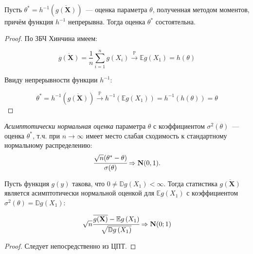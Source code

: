 \begin{thm*}
Пусть $\theta^{*}=h^{-1}(\overline{g(\mathbf{X})})$~--- оценка параметра $\theta$, полученная методом моментов, причём функция $h^{-1}$ непрерывна. Тогда оценка $\theta^{*}$ состоятельна.
\end{thm*}

\begin{proof}
По ЗБЧ Хинчина имеем:

\begin{equation*}
    \overline{g(\mathbf{X})}=\frac{1}{n} \sum\limits_{i=1}^{n} g\left(X_{i}\right) \xrightarrow[]{\mathbb{P}} \mathbb{E} g\left(X_{1}\right)=h(\theta)
\end{equation*}

Ввиду непрерывности функции $h^{-1}$:

\begin{equation*}
    \theta^{*}=h^{-1}(\overline{g(\mathbf{X})}) \xrightarrow[]{\mathbb{P}} h^{-1}\left(\mathbb{E} g\left(X_{1}\right)\right)=h^{-1}(h(\theta))=\theta
\end{equation*}
\end{proof}

\begin{defn}
{\it Асимптотически нормальная оценка} параметра $\theta$ с коэффициентом $\sigma^{2}(\theta)$~--- оценка $\theta^{*}$, т.ч. при $n \rightarrow \infty$ имеет место слабая сходимость к стандартному нормальному распределению: 
\begin{equation*}
    \cfrac{\sqrt{n}(\theta^{*}-\theta)}{\sigma(\theta)} \Rightarrow \mathbf{N}(0, 1).
\end{equation*}
\end{defn}

\begin{lem}
Пусть функция $g(y)$ такова, что $0 \neq \mathbb{D} g\left(X_{1}\right)<\infty$. Тогда статистика $\overline{g(\mathbf{X})}$ является асимптотически нормальной оценкой для $\mathbb{E} g\left(X_{1}\right)$ с коэффициентом $\sigma^{2}(\theta)=\mathbb{D} g\left(X_{1}\right)$:

\begin{equation*}
    \sqrt{n} \cfrac{\overline{g(\mathbf{X})}-\mathbb{E} g\left(X_{1}\right)}{\sqrt{\mathbb{D} g\left(X_{1}\right)}} \Rightarrow \mathbf{N}(0;1)
\end{equation*}
\end{lem}

\begin{proof}
Следует непосредственно из ЦПТ.
\end{proof}

